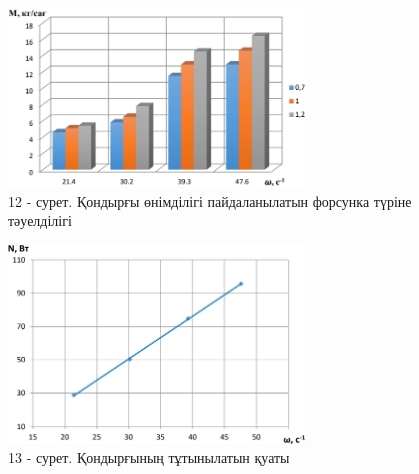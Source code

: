 \begin{figure}[H]
	\centering
	\includegraphics[width=0.7\textwidth]{media/pish/image45}
	\caption*{12 - сурет. Қондырғы өнімділігі пайдаланылатын форсунка түріне тәуелділігі}
\end{figure}

\begin{figure}[H]
	\centering
	\includegraphics[width=0.7\textwidth]{media/pish/image46}
	\caption*{13 - сурет. Қондырғының тұтынылатын қуаты}
\end{figure}

